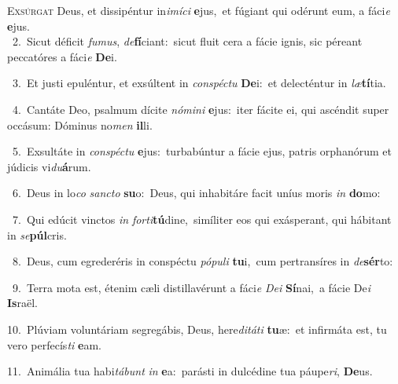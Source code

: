 \lettrine{\initial\textcolor{\initialcolor}{E}}{xsúrgat} Deus, et dissipéntur in\-\textit{i}\-\textit{mí}\textit{ci} \textbf{e}\-jus,~\star et fúgiant qui odérunt eum, a fáci\textit{e} \textbf{e}\-jus.\\
{\numbfont\textcolor{\numbcolor}{~2.}}~Sicut déficit \textit{fu}\-\textit{mus}, \textit{de}\-\textbf{fí}ciant:~\star sicut fluit cera a fácie ignis, sic péreant peccatóres a fáci\textit{e} \textbf{De}\-i.\par
{\numbfont\textcolor{\numbcolor}{~3.}}~Et justi epuléntur, et exsúltent in \textit{con}\-\textit{spéc}\textit{tu} \textbf{De}\-i:~\star et delecténtur in \textit{læ}\-\textbf{tí}tia.\par
{\numbfont\textcolor{\numbcolor}{~4.}}~Cantáte Deo, psalmum dícite \textit{nó}\-\textit{mi}\textit{ni} \textbf{e}\-jus:~\star iter fácite ei, qui ascéndit super occásum: Dóminus no\textit{men} \textbf{il}\-li.\par
{\numbfont\textcolor{\numbcolor}{~5.}}~Exsultáte in \textit{con}\-\textit{spéc}\textit{tu} \textbf{e}\-jus:~\star turbabúntur a fácie ejus, patris orphanórum et júdicis vi\-\textit{du}\-\textbf{á}rum.\par
{\numbfont\textcolor{\numbcolor}{~6.}}~Deus in lo\textit{co} \textit{sanc}\-\textit{to} \textbf{su}\-o:~\star Deus, qui inhabitáre facit uníus moris \textit{in} \textbf{do}\-mo:\par
{\numbfont\textcolor{\numbcolor}{~7.}}~Qui edúcit vinctos \textit{in} \textit{for}\-\textit{ti}\textbf{tú}dine,~\star simíliter eos qui exásperant, qui hábitant in \textit{se}\-\textbf{púl}cris.\par
{\numbfont\textcolor{\numbcolor}{~8.}}~Deus, cum egrederéris in conspéctu \textit{pó}\-\textit{pu}\textit{li} \textbf{tu}\-i,~\star cum pertransíres in \textit{de}\-\textbf{sér}to:\par
{\numbfont\textcolor{\numbcolor}{~9.}}~Terra mota est, étenim cæli distillavérunt a fáci\textit{e} \textit{De}\-\textit{i} \textbf{Sí}\-nai,~\star a fácie De\textit{i} \textbf{Is}\-raël.\par
{\numbfont\textcolor{\numbcolor}{10.}}~Plúviam voluntáriam segregábis, Deus, here\-\textit{di}\-\textit{tá}\textit{ti} \textbf{tu}\-æ:~\star et infirmáta est, tu vero perfecís\textit{ti} \textbf{e}\-am.\par
{\numbfont\textcolor{\numbcolor}{11.}}~Animália tua habi\-\textit{tá}\-\textit{bunt} \textit{in} \textbf{e}\-a:~\star parásti in dulcédine tua páupe\-\textit{ri}\-, \textbf{De}\-us.\par
